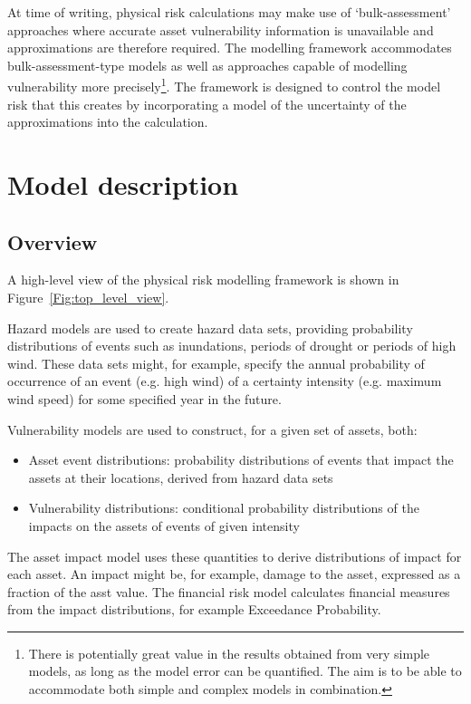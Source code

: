 \documentclass[a4paper,11pt]{extarticle} %
\begin{document}
At time of writing, physical risk calculations may make use of `bulk-assessment' approaches where accurate asset vulnerability information is unavailable and approximations are therefore required. The modelling framework accommodates bulk-assessment-type models as well as approaches capable of modelling vulnerability more precisely\footnote{There is potentially great value in the results obtained from very simple models, as long as the model error can be quantified. The aim is to be able to accommodate both simple and complex models in combination.}. The framework is designed to control the model risk that this creates by incorporating a model of the uncertainty of the approximations into the calculation. 


\section{Model description}

\subsection{Overview}
A high-level view of the physical risk modelling framework is shown in Figure~\ref{Fig:top_level_view}. 

Hazard models are used to create hazard data sets, providing probability distributions of events such as inundations, periods of drought or periods of high wind. These data sets might, for example, specify the annual probability of occurrence of an event (e.g. high wind) of a certainty intensity (e.g. maximum wind speed) for some specified year in the future.

Vulnerability models are used to construct, for a given set of assets, both:
\begin{itemize}
	\item Asset event distributions: probability distributions of events that impact the assets at their locations, derived from hazard data sets
	\item Vulnerability distributions: conditional probability distributions of the impacts on the assets of events of given intensity  
\end{itemize}

The asset impact model uses these quantities to derive distributions of impact for each asset. An impact might be, for example, damage to the asset, expressed as a fraction of the asst value. The financial risk model calculates financial measures from the impact distributions, for example Exceedance Probability.
\end{document}
